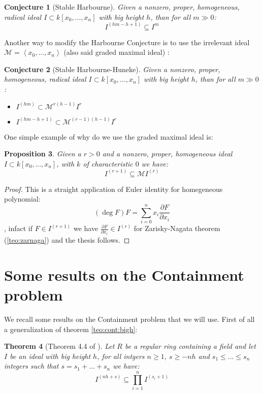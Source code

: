 \documentclass[]{book}
\theoremstyle{plain}
\newtheorem{teo}{Theorem}[section]
\newtheorem{prop}[teo]{Proposition}
\newtheorem{conj}[teo]{Conjecture}
\theoremstyle{remark}
\theoremstyle{definition}
\newcommand{\parder}[2]{ \frac{\partial #1}{\partial #2} }
\newcommand{\MM}{\mathcal{M}}
\newcommand{\cont}[2]{ I^{(#1)} \subseteq I^{#2}}
\begin{document}
	\begin{conj}[Stable Harbourne]\label{conj:stabharb}
			Given a nonzero, proper, homogeneous, radical ideal $ I \subset k[x_0 , ... , x_n] $ with big height $ h $, than for all $ m \gg 0 $:
			\[
			\cont{hm - h +1}{m}
			\]
	\end{conj} 
	
	Another way to modify the Harbourne Conjecture is to use the irrelevant ideal $ \MM=\left\langle x_0 , ... ,x_n \right> $ (also said graded maximal ideal) : 
	
	\begin{conj}[Stable Harbourne-Huneke]\label{conj:stabharbhun}
	Given a nonzero, proper, homogeneous, radical ideal $ I \subset k[x_0 , ... , x_n] $ with big height $ h $, than for all $ m \gg 0 $:
	\begin{itemize}
	\item $ I^{(hm)} \subset \MM^{r(h-1)} I^r$
	\item $ I^{(hm - h +1 )} \subset \MM^{(r-1)(h-1)} I^r $
	\end{itemize}
	\end{conj}
	
	One simple example of why do we use the graded maximal ideal is:
	
	\begin{prop} \label{prop:eulid}
	Given a $ r>0 $ and a nonzero, proper, homogeneous ideal $ I \subset k[x_0 , ... , x_n] $, with $ k $ of characteristic $ 0 $ we have:
	\[ I^{(r+1)}   \subseteq \MM I^{(r)}\]
	\end{prop}
	\begin{proof}
	This is a straight application of Euler identity for homegeneous polynomial:
	\[ (\deg{F})F = \sum_{i=0}^{n} x_i \parder{F}{x_i} \]
	, infact if $ F \in I^{(r+1)} $ we have $ \parder{F}{x_i} \in I^{(r)} $ for Zarisky-Nagata theorem (\ref{teo:zarnaga}) and the thesis follows.
 	\end{proof}
 	

\section{Some results on the Containment problem}

We recall some results on the Containment problem that we will use. First of all a generalization of theorem \ref{teo:cont:bigh}:

\begin{teo}[Theorem 4.4 of \cite{John14}]\label{teo:cont:bighgen}
Let $ R $ be a regular ring containing a field and let $ I $ be an ideal with big height $ h $, for all intgers $ n \geq 1 $, $ s \geq -nh $ and $ s_1 \leq  ... \leq s_n $ integers such that $ s = s_1 +  ... + s_n $ we have:
\begin{equation}\label{eq:cont:bighgen}
	I^{(nh + s)} \subseteq \prod_{i=1}^{n} I^{(s_i + 1)}
\end{equation}
\end{teo}
\end{document}
